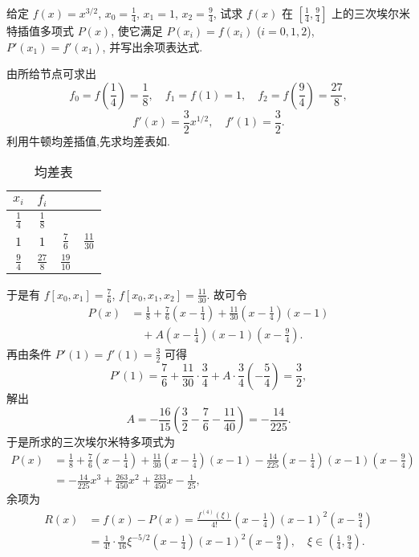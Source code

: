 \documentclass[../../main.tex]{subfiles}
\begin{document}
\begin{example}
给定 $f(x) = x^{3/2}$, $x_0 = \frac{1}{4}$, $x_1 = 1$, $x_2 = \frac{9}{4}$, 试求 $f(x)$ 在 $\left[ \frac{1}{4}, \frac{9}{4} \right]$ 上的三次埃尔米特插值多项式 $P(x)$, 使它满足 $P(x_i) = f(x_i)$ ($i = 0, 1, 2$), $P'(x_1) = f'(x_1)$, 并写出余项表达式.
\end{example}
\begin{solution}
由所给节点可求出
\[
f_0 = f\left( \frac{1}{4} \right) = \frac{1}{8}, \quad f_1 = f(1) = 1, \quad f_2 = f\left( \frac{9}{4} \right) = \frac{27}{8},
\]
\[
f'(x) = \frac{3}{2} x^{1/2}, \quad f'(1) = \frac{3}{2}.
\]
利用牛顿均差插值,先求均差表如.
\begin{table}[H]
\centering
\caption{均差表}
\label{table:均差表111}
\begin{tabular}{c c c c}
\toprule
$x_i$ & $f_i$ &  &  \\
\midrule
$\frac{1}{4}$ & $\frac{1}{8}$ &  &  \\
$1$ & $1$ & $\frac{7}{6}$ & $\frac{11}{30}$ \\
$\frac{9}{4}$ & $\frac{27}{8}$ & $\frac{19}{10}$ &  \\
\bottomrule
\end{tabular}
\end{table}

于是有 $f[x_0, x_1] = \frac{7}{6}$, $f[x_0, x_1, x_2] = \frac{11}{30}$.
故可令
\begin{align*}
P(x) &= \frac{1}{8} + \frac{7}{6} \left( x - \frac{1}{4} \right) + \frac{11}{30} \left( x - \frac{1}{4} \right)(x - 1) \\
&\quad + A \left( x - \frac{1}{4} \right)(x - 1) \left( x - \frac{9}{4} \right).
\end{align*}
再由条件 $P'(1) = f'(1) = \frac{3}{2}$ 可得
\[
P'(1) = \frac{7}{6} + \frac{11}{30} \cdot \frac{3}{4} + A \cdot \frac{3}{4} \left( -\frac{5}{4} \right) = \frac{3}{2},
\]
解出
\[
A = -\frac{16}{15} \left( \frac{3}{2} - \frac{7}{6} - \frac{11}{40} \right) = -\frac{14}{225}.
\]
于是所求的三次埃尔米特多项式为
\begin{align*}
P(x) &= \frac{1}{8} + \frac{7}{6} \left( x - \frac{1}{4} \right) + \frac{11}{30} \left( x - \frac{1}{4} \right)(x - 1) - \frac{14}{225} \left( x - \frac{1}{4} \right)(x - 1) \left( x - \frac{9}{4} \right) \\
&= -\frac{14}{225} x^3 + \frac{263}{450} x^2 + \frac{233}{450} x - \frac{1}{25},
\end{align*}
余项为
\begin{align*}
R(x) &= f(x) - P(x) = \frac{f^{(4)}(\xi)}{4!} \left( x - \frac{1}{4} \right)(x - 1)^2 \left( x - \frac{9}{4} \right) \\
&= \frac{1}{4!} \cdot \frac{9}{16} \xi^{-5/2} \left( x - \frac{1}{4} \right)(x - 1)^2 \left( x - \frac{9}{4} \right), \quad \xi \in \left( \frac{1}{4}, \frac{9}{4} \right).
\end{align*}

\end{solution}
\end{document}
